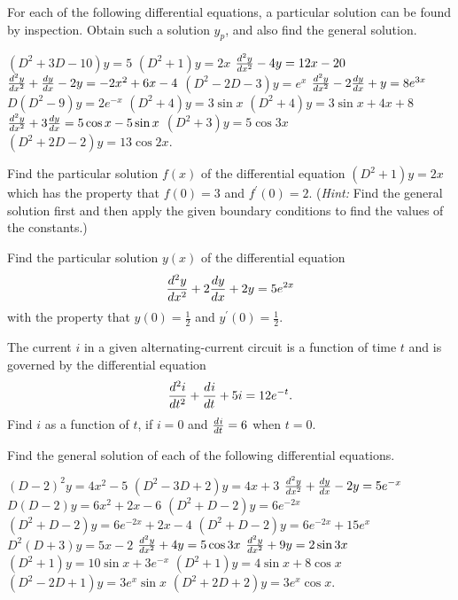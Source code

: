 \begin{exercises}

For each of the following differential equations,
a particular solution can be found by inspection.
Obtain such a solution $y_p$, and also find
the general solution.
\begin{exenum}
\x
$(D^2+3D-10)y=5$
\x
$(D^2+1)y = 2x$
\x
$\frac{d^{2}{y}}{dx^{2}} - 4y = 12x - 20$
\x
$\frac{d^{2}{y}}{dx^{2}} + \frac{d y}{d x} - 2y = -2x^2+6x-4$
\x
$(D^2-2D-3)y=e^x$
\x
$\frac{d^{2}{y}}{dx^{2}} - 2\frac{d y}{d x} + y = 8e^{3x}$
\x
$D(D^2-9)y = 2e^{-x}$
\x
$(D^2+4)y = 3\sin x$
\x
$(D^2+4)y = 3\sin x + 4x + 8$
\x
$\frac{d^{2}{y}}{dx^{2}} + 3\frac{d y}{d x} = 5\cos x - 5 \sin x$
\x
$(D^2+3)y = 5\cos 3x$
\x
$(D^2+2D-2)y = 13 \cos 2x$.
\end{exenum}

Find the particular solution $f(x)$ of the differential
equation $(D^2+1)y=2x$ which has the property
that $f(0)=3$ and $f^\prime(0)=2$.
(\emph{Hint:} Find the general solution first and then
apply the given boundary conditions to find the values of
the constants.)

Find the particular solution $y(x)$ of the
differential equation
\[
\frac{d^{2}{y}}{dx^{2}} + 2\frac{d y}{d x} +2y = 5e^{2x}
\]
with the property that $y(0)=\frac12$
and $y^\prime(0)=\frac12$.

The current $i$ in a given alternating-current circuit is a
function of time $t$ and is governed by the differential
equation
\[
\frac{d^{2}{i}}{d{t}^{2}}+\frac{d^{}{i}}{d{t}^{}} + 5i = 12e^{-t}
.
\]
Find $i$ as a function of $t$, if $i=0$ and
$\frac{d^{}{i}}{d{t}^{}} = 6$ when $t=0$.

Find the general solution of each of the following
differential equations.
\begin{exenum}
\x
$(D-2)^2y=4x^2-5$
\x
$(D^2-3D+2)y=4x+3$
\x
$\frac{d^{2}{y}}{dx^{2}} + \frac{d y}{d x} - 2y = 5e^{-x}$
\x
$D(D-2)y = 6x^2+2x-6$
\x
$(D^2+D-2)y = 6e^{-2x}$
\x
$(D^2+D-2)y=6e^{-2x} + 2x - 4$
\x
$(D^2+D-2)y = 6e^{-2x} + 15e^x$
\x
$D^2(D+3)y = 5x-2$
\x
$\frac{d^{2}{y}}{dx^{2}} + 4y = 5 \cos 3x$
\x
$\frac{d^{2}{y}}{dx^{2}} + 9y = 2 \sin 3x$
\x
$(D^2+1)y = 10 \sin x + 3e^{-x}$
\x
$(D^2+1)y = 4\sin x + 8\cos x$
\x
$(D^2-2D+1)y = 3e^x \sin x$
\x
$(D^2+2D+2)y = 3e^x \cos x$.
\end{exenum}

\end{exercises}
